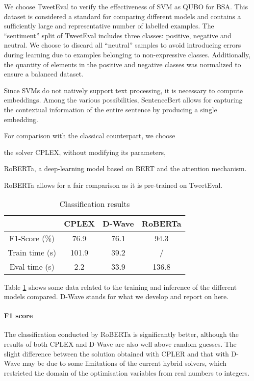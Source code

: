 \documentclass{ceurart}
\begin{document}
\begin{spacing}{1}
We choose TweetEval\cite{TweetEval} to verify the effectiveness of SVM as QUBO for BSA. This dataset is considered a standard for comparing different models and contains a sufficiently large and representative number of labelled examples. The ``sentiment'' split of TweetEval includes three classes: positive, negative and neutral. We choose to discard all ``neutral'' samples to avoid introducing errors during learning due to examples belonging to non-expressive classes. Additionally, the quantity of elements in the positive and negative classes was normalized to ensure a balanced dataset.

Since SVMs do not natively support text processing, it is necessary to compute embeddings. Among the various possibilities, SentenceBert\cite{SentenceBert} allows for capturing the contextual information of the entire sentence by producing a single embedding.

For comparison with the classical counterpart, we choose 
\begin{enumerate*}
    \item the solver CPLEX\cite{cplex}, without modifying its parameters,
    \item RoBERTa\cite{ROBERTA}, a deep-learning model based on BERT\cite{BERT} and the attention mechanism\cite{Attention}.
\end{enumerate*}
RoBERTa allows for a fair comparison as it is pre-trained on TweetEval.

\begin{table}
    \caption{Classification results}
    \label{tab:classification}
    \begin{tabular}{cccc}
        \toprule
        & CPLEX & D-Wave & RoBERTa \\
        \midrule
        F1-Score (\%) & 76.9 & 76.1 & 94.3 \\
        Train time (s) & 101.9 & 39.2 & / \\
        Eval time (s) & 2.2 & 33.9 & 136.8 \\
        \bottomrule
    \end{tabular}
\end{table}

Table \ref{tab:classification} shows some data related to the training and inference of the different models compared. D-Wave stands for what we develop and report on here.

\paragraph{F1 score} The classification conducted by RoBERTa is significantly better, although the results of both CPLEX and D-Wave are also well above random guesses. The slight difference between the solution obtained with CPLER and that with D-Wave may be due to some limitations of the current hybrid solvers, which restricted the domain of the optimisation variables from real numbers to integers.


\end{spacing}
\end{document}

